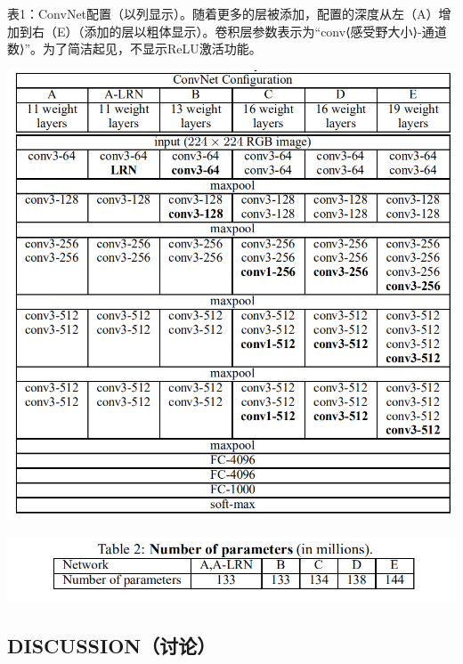 \documentclass[12pt,a4paper,UTF8,twoside]{book}
\begin{document}
表1：ConvNet配置（以列显示）。随着更多的层被添加，配置的深度从左（A）增加到右（E）（添加的层以粗体显示）。卷积层参数表示为``conv⟨感受野大小⟩-通道数⟩''。为了简洁起见，不显示ReLU激活功能。

\begin{center}\includegraphics[width=0.7\linewidth]{img/03-01} \end{center}

\begin{center}\includegraphics[width=0.7\linewidth]{img/03-02} \end{center}

\hypertarget{discussionux8ba8ux8bba}{%
\subsection{DISCUSSION（讨论）}\label{discussionux8ba8ux8bba}}
\end{document}
